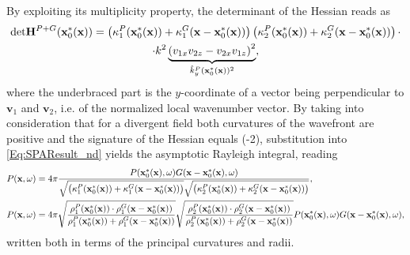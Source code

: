 By exploiting its multiplicity property, the determinant of the Hessian reads as
\begin{multline}
\label{Eq:HF_approx:H_det_Rayleigh}
\small
\mathrm{det} \mathbf{H}^{P+G}(\mathbf{x}_0^*(\mathbf{x})) = 
\left(\kappa_1^P(\mathbf{x}_0^*(\mathbf{x})) + \kappa_1^G(\mathbf{x}-\mathbf{x}_0^*(\mathbf{x}))\right)
\left(\kappa_2^P(\mathbf{x}_0^*(\mathbf{x})) + \kappa_2^G(\mathbf{x}-\mathbf{x}_0^*(\mathbf{x}))\right)
\cdot \\ \cdot
k^2 \underbrace{\left( v_{1 x}v_{2 z}-v_{2 x}v_{1 z} \right)^2}_{\hat{k}_y^P(\mathbf{x}_0^*(\mathbf{x}))^2},
\end{multline}
where the underbraced part is the $y$-coordinate of a vector being perpendicular to $\mathbf{v}_1$ and $\mathbf{v}_2$, i.e. of the normalized local wavenumber vector.
By taking into consideration that for a divergent field both curvatures of the wavefront are positive and the signature of the Hessian equals (-2), substitution into \eqref{Eq:SPAResult_nd} yields the asymptotic Rayleigh integral, reading
\footnotesize
\begin{align}
\label{eq:HF_approx:asymptotic_rayleigh}
P(\mathbf{x},\omega) &= 4\pi \frac{P(\mathbf{x}_0^*(\mathbf{x}),\omega) G(\mathbf{x}-\mathbf{x}_0^*(\mathbf{x}),\omega)}
{
\sqrt{\left(\kappa_1^P(\mathbf{x}_0^*(\mathbf{x})) + \kappa_1^G(\mathbf{x}-\mathbf{x}_0^*(\mathbf{x}))\right)}
\sqrt{\left(\kappa_2^P(\mathbf{x}_0^*(\mathbf{x})) + \kappa_2^G(\mathbf{x}-\mathbf{x}_0^*(\mathbf{x}))\right)}}, \nonumber \\
P(\mathbf{x},\omega) &= 4\pi
\sqrt{\frac{\rho_1^P(\mathbf{x}_0^*(\mathbf{x})) \cdot \rho_1^G(\mathbf{x}-\mathbf{x}_0^*(\mathbf{x}))}{\rho_1^P(\mathbf{x}_0^*(\mathbf{x})) + \rho_1^G(\mathbf{x}-\mathbf{x}_0^*(\mathbf{x}))}}
\sqrt{\frac{\rho_2^P(\mathbf{x}_0^*(\mathbf{x})) \cdot \rho_2^G(\mathbf{x}-\mathbf{x}_0^*(\mathbf{x}))}{\rho_2^P(\mathbf{x}_0^*(\mathbf{x})) + \rho_2^G(\mathbf{x}-\mathbf{x}_0^*(\mathbf{x}))}}
P(\mathbf{x}_0^*(\mathbf{x}),\omega) G(\mathbf{x}-\mathbf{x}_0^*(\mathbf{x}),\omega),
\end{align}
\normalsize
written both in terms of the principal curvatures and radii.

